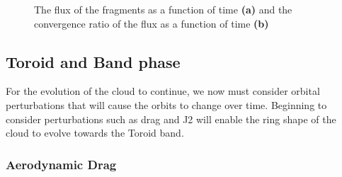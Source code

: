 \documentclass[a4paper, 12pt]{article}
\begin{document}
\begin{figure}[t]
	\begin{adjustbox}{max width=1\linewidth,center}
		\centering     %
	\end{adjustbox}
	\caption{The flux of the fragments as a function of time \textbf{(a)} and the convergence ratio of the flux as a function of time \textbf{(b)} }
	\label{flux_plots}
\end{figure}


\subsection{Toroid and Band phase}
For the evolution of the cloud to continue, we now must consider orbital perturbations that will cause the orbits to change over time. Beginning to consider perturbations such as drag and J2 will enable the ring shape of the cloud to evolve towards the Toroid band. 

\subsubsection{Aerodynamic Drag}
\end{document}
